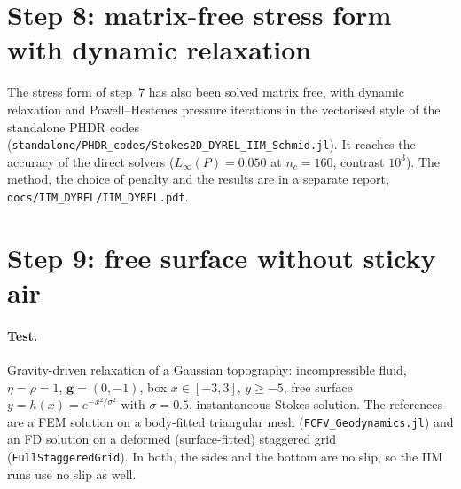\documentclass[11pt,a4paper]{article}
\newcommand{\code}[1]{\texttt{#1}}
\begin{document}
\section{Step 8: matrix-free stress form with dynamic relaxation}\label{sec:s8}

The stress form of step~7 has also been solved matrix free, with dynamic relaxation and
Powell--Hestenes pressure iterations in the vectorised style of the standalone PHDR codes
(\code{standalone/PHDR\_codes/Stokes2D\_DYREL\_IIM\_Schmid.jl}). It reaches the accuracy of the
direct solvers ($L_\infty(P)=0.050$ at $n_c=160$, contrast $10^3$). The method, the choice of
penalty and the results are in a separate report, \code{docs/IIM\_DYREL/IIM\_DYREL.pdf}.

\section{Step 9: free surface without sticky air}\label{sec:s9}

\paragraph{Test.} Gravity-driven relaxation of a Gaussian topography: incompressible fluid,
$\eta=\rho=1$, $\mathbf g=(0,-1)$, box $x\in[-3,3]$, $y\ge-5$, free surface
$y=h(x)=e^{-x^2/\sigma^2}$ with $\sigma=0.5$, instantaneous Stokes solution. The references are a
FEM solution on a body-fitted triangular mesh (\code{FCFV\_Geodynamics.jl}) and an FD solution on
a deformed (surface-fitted) staggered grid (\code{FullStaggeredGrid}). In both, the sides and the
bottom are no slip, so the IIM runs use no slip as well.
\end{document}
